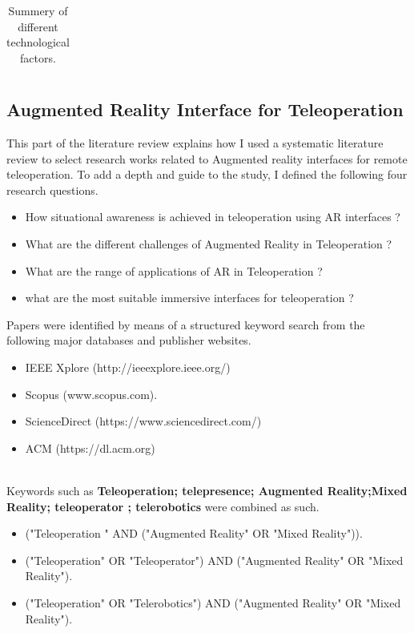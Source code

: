 \begin{longtable}{p{2.5cm} p{5cm} p{5cm} p{1cm}}
\caption{Summery of different technological factors.}
\label{table:tasks}
\end{longtable}

\subsection{Augmented Reality Interface for Teleoperation}
This part of the literature review explains how I used a systematic literature review to select research works related to Augmented reality interfaces for remote teleoperation. To add a depth and guide to the study, I defined the following four research questions.

\begin{itemize}
    \item How situational awareness is achieved in teleoperation using AR interfaces ?
    \item What are the different challenges of Augmented Reality in Teleoperation ?
    \item What are the range of applications of AR in Teleoperation ?
    \item what are the most suitable immersive interfaces for teleoperation ?
\end{itemize}

Papers were identified by means of a structured keyword search from the following major databases and publisher websites.

\begin{itemize}
    \item IEEE Xplore (http://ieeexplore.ieee.org/)
    \item Scopus (www.scopus.com).
    \item ScienceDirect (https://www.sciencedirect.com/)
    \item ACM (https://dl.acm.org)
\end{itemize}\\

Keywords such as \textbf{Teleoperation; telepresence; Augmented Reality;Mixed Reality; teleoperator ; telerobotics} were combined as such.
\begin{itemize}
    \item ("Teleoperation " AND ("Augmented Reality" OR "Mixed Reality")).
    \item ("Teleoperation" OR "Teleoperator") AND ("Augmented Reality" OR "Mixed Reality").
    \item ("Teleoperation" OR "Telerobotics") AND ("Augmented Reality" OR "Mixed Reality").
\end{itemize}

